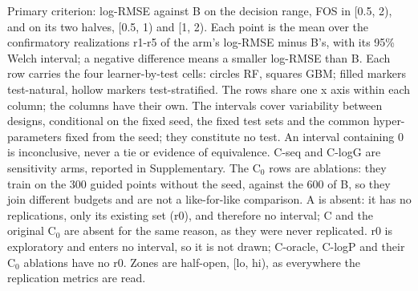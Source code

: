 Primary criterion: log-RMSE against B on the decision range, FOS in [0.5, 2), and on its two halves, [0.5, 1) and [1, 2). Each point is the mean over the confirmatory realizations r1-r5 of the arm's log-RMSE minus B's, with its 95\% Welch interval; a negative difference means a smaller log-RMSE than B. Each row carries the four learner-by-test cells: circles RF, squares GBM; filled markers test-natural, hollow markers test-stratified. The rows share one x axis within each column; the columns have their own. The intervals cover variability between designs, conditional on the fixed seed, the fixed test sets and the common hyper-parameters fixed from the seed; they constitute no test. An interval containing 0 is inconclusive, never a tie or evidence of equivalence. C-seq and C-logG are sensitivity arms, reported in Supplementary. The C$_0$ rows are ablations: they train on the 300 guided points without the seed, against the 600 of B, so they join different budgets and are not a like-for-like comparison. A is absent: it has no replications, only its existing set (r0), and therefore no interval; C and the original C$_0$ are absent for the same reason, as they were never replicated. r0 is exploratory and enters no interval, so it is not drawn; C-oracle, C-logP and their C$_0$ ablations have no r0. Zones are half-open, [lo, hi), as everywhere the replication metrics are read.
